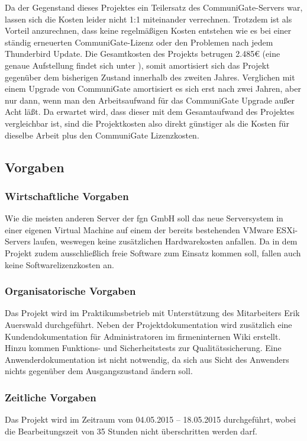 \documentclass[11pt,a4paper,titlepage=firstiscover,headsepline,bibtotoc]{scrartcl} %
\begin{document}
Da der Gegenstand dieses Projektes ein Teilersatz des CommuniGate-Servers war, lassen sich die Kosten leider nicht 1:1 miteinander verrechnen. Trotzdem ist als Vorteil anzurechnen, dass keine regelmäßigen Kosten entstehen wie es bei einer ständig erneuerten CommuniGate-Lizenz oder den Problemen nach jedem Thunderbird Update. Die Gesamtkosten des Projekts betrugen 2.485\euro{} (eine genaue Aufstellung findet sich unter ), somit amortisiert sich das Projekt gegenüber dem bisherigen Zustand innerhalb des zweiten Jahres. Verglichen mit einem Upgrade von CommuniGate amortisiert es sich erst nach zwei Jahren, aber nur dann, wenn man den Arbeitsaufwand für das CommuniGate Upgrade außer Acht läßt. Da erwartet wird, dass dieser mit dem Gesamtaufwand des Projektes vergleichbar ist, sind die Projektkosten also direkt günstiger als die Kosten für dieselbe Arbeit plus den CommuniGate Lizenzkosten.

\subsection{Vorgaben}
\subsubsection{Wirtschaftliche Vorgaben}
Wie die meisten anderen Server der fgn GmbH soll das neue Serversystem in einer eigenen Virtual Machine auf einem der bereits bestehenden VMware ESXi-Servers laufen, weswegen keine zusätzlichen Hardwarekosten anfallen. Da in dem Projekt zudem ausschließlich freie Software zum Einsatz kommen soll, fallen auch keine Softwarelizenzkosten an.

\subsubsection{Organisatorische Vorgaben}
Das Projekt wird im Praktikumsbetrieb mit Unterstützung des Mitarbeiters Erik Auerswald durchgeführt.
Neben der Projektdokumentation wird zusätzlich eine Kundendokumentation für Administratoren im firmeninternen Wiki erstellt. Hinzu kommen Funktions- und Sicherheitstests zur Qualitätssicherung. Eine Anwenderdokumentation ist nicht notwendig, da sich aus Sicht des Anwenders nichts gegenüber dem Ausgangszustand ändern soll.

\subsubsection{Zeitliche Vorgaben}
Das Projekt wird im Zeitraum vom 04.05.2015 – 18.05.2015 durchgeführt, wobei die Bearbeitungszeit von 35 Stunden nicht überschritten werden darf.
\end{document}

